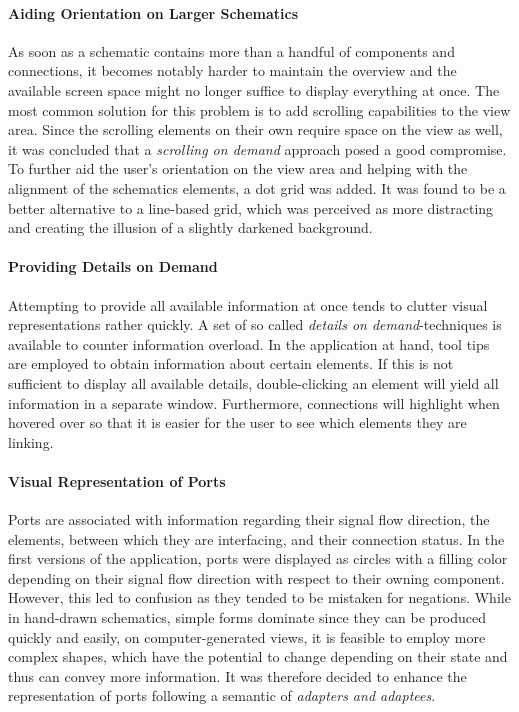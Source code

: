 	\paragraph{Aiding Orientation on Larger Schematics}
		As soon as a schematic contains more than a handful of components and connections, it becomes notably harder to maintain the overview and the available screen space might no longer suffice to display everything at once.
		The most common solution for this problem is to add scrolling capabilities to the view area.
		Since the scrolling elements on their own require space on the view as well, it was concluded that a \emph{scrolling on demand} approach posed a good compromise.
		To further aid the user's orientation on the view area and helping with the alignment of the schematics elements, a dot grid was added.
		It was found to be a better alternative to a line-based grid, which was perceived as more distracting and creating the illusion of a slightly darkened background.
	
	\paragraph{Providing Details on Demand}
		Attempting to provide all available information at once tends to clutter visual representations rather quickly.
		A set of so called \emph{details on demand}-techniques is available to counter information overload.
		In the application at hand, tool tips are employed to obtain information about certain elements.
		If this is not sufficient to display all available details, double-clicking an element will yield all information in a separate window.
		Furthermore, connections will highlight when hovered over so that it is easier for the user to see which elements they are linking.
	
	\paragraph{Visual Representation of Ports}
		Ports are associated with information regarding their signal flow direction, the elements, between which they are interfacing, and their connection status.
		In the first versions of the application, ports were displayed as circles with a filling color depending on their signal flow direction with respect to their owning component.
		However, this led to confusion as they tended to be mistaken for negations.
		While in hand-drawn schematics, simple forms dominate since they can be produced quickly and easily, on computer-generated views, it is feasible to employ more complex shapes, which have the potential to change depending on their state and thus can convey more information.
		It was therefore decided to enhance the representation of ports following a semantic of \emph{adapters and adaptees}.
	

